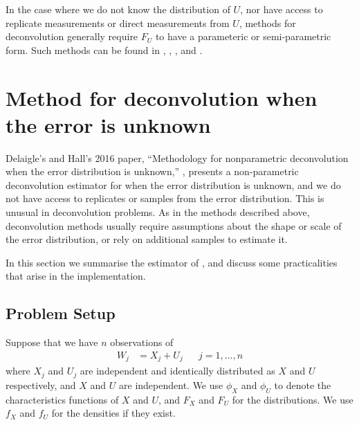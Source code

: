 	In the case where we do not know the distribution of $U$, nor have access to replicate measurements or direct measurements from $U$, methods for deconvolution generally require $F_U$ to have a parameteric or semi-parametric form. Such methods can be found in \cite{Butucea2005-be}, \cite{Meister2006-nu}, \cite{Butucea2008-wm}, and \cite{Kneip2012-aa}.
 
\section{Method for deconvolution when the error is unknown}
\label{sec:summary of delaigle hall}
	Delaigle's and Hall's 2016 paper, ``Methodology for nonparametric deconvolution when the error distribution is unknown,'' \cite{Delaigle2016-la}, presents a non-parametric deconvolution estimator for when the error distribution is unknown, and we do not have access to replicates or samples from the error distribution. This is unusual in deconvolution problems. As in the methods described above, deconvolution methods usually require assumptions about the shape or scale of the error distribution, or rely on additional samples to estimate it. 

	In this section we summarise the estimator of \cite{Delaigle2016-la}, and discuss some practicalities that arise in the implementation. 

	\subsection{Problem Setup}
	Suppose that we have $n$ observations of
	\begin{align}
		W_j &= X_j + U_j &&j = 1, \dots, n
	\end{align}
	where $X_j$ and $U_j$ are independent and identically distributed as $X$ and $U$ respectively, and $X$ and $U$ are independent. We use $\phi_X$ and $\phi_U$ to denote the characteristics functions of $X$ and $U$, and $F_X$ and $F_U$ for the distributions. We use $f_X$ and $f_U$ for the densities if they exist.


